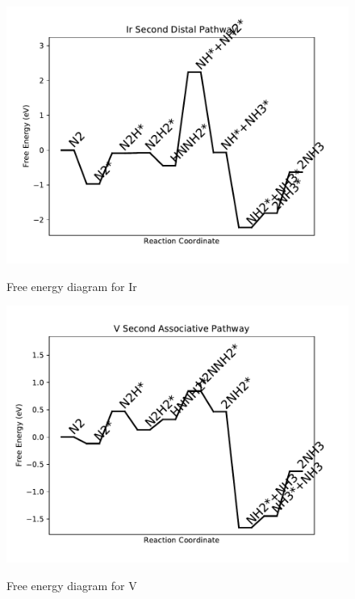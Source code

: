 \documentclass[journal=jacsat,manuscript=article]{achemso}
\begin{document}
\begin{figure}
\includegraphics[width=1\linewidth]{data/plots/Ir_distal_2.pdf}
\label{fig:Ir_distal_2}
\caption{Free energy diagram for Ir}
\end{figure}

\newpage
\begin{figure}
\includegraphics[width=1\linewidth]{data/plots/V_associative_2.pdf}
\label{fig:V_associative_2}
\caption{Free energy diagram for V}
\end{figure}
\end{document}
